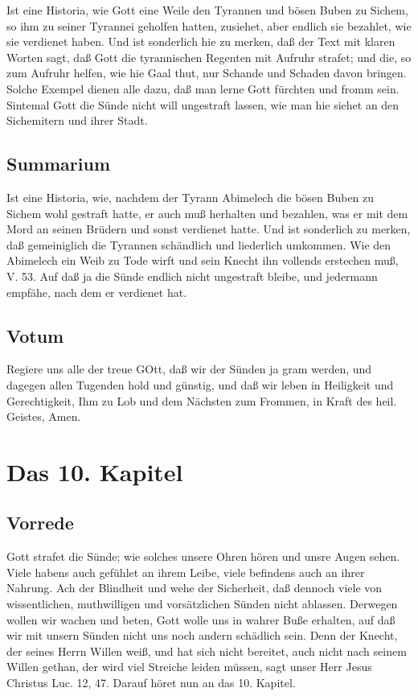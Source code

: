 Ist eine Historia, wie Gott eine Weile den Tyrannen und bösen Buben zu Sichem, so ihm zu seiner Tyrannei geholfen hatten, zusiehet, aber endlich sie bezahlet, wie sie verdienet haben. Und ist sonderlich hie zu merken, daß der Text mit klaren Worten sagt, daß Gott die tyrannischen Regenten mit Aufruhr strafet; und die, so zum Aufruhr helfen, wie hie Gaal thut, nur Schande und Schaden davon bringen. Solche Exempel dienen alle dazu, daß man lerne Gott fürchten und fromm sein. Sintemal Gott die Sünde nicht will ungestraft lassen, wie man hie siehet an den Sichemitern und ihrer Stadt.

\section{Summarium}

Ist eine Historia, wie, nachdem der Tyrann Abimelech die bösen Buben zu Sichem wohl gestraft hatte, er auch muß herhalten und bezahlen, was er mit dem Mord an seinen Brüdern und sonst verdienet hatte. Und ist sonderlich zu merken, daß gemeiniglich die Tyrannen schändlich und liederlich umkommen. Wie den Abimelech ein Weib zu Tode wirft und sein Knecht ihn vollends erstechen muß, V. 53. Auf daß ja die Sünde endlich nicht ungestraft bleibe, und jedermann empfähe, nach dem er verdienet hat.

\section{Votum}

Regiere uns alle der treue GOtt, daß wir der Sünden ja gram werden, und dagegen allen Tugenden hold und günstig, und daß wir leben in Heiligkeit und Gerechtigkeit, Ihm zu Lob und dem Nächsten zum Frommen, in Kraft des heil. Geistes, Amen.

\chapter{Das 10. Kapitel}

\section{Vorrede}

Gott strafet die Sünde; wie solches unsere Ohren hören und unsre Augen sehen. Viele habens auch gefühlet an ihrem Leibe, viele befindens auch an ihrer Nahrung. Ach der Blindheit und wehe der Sicherheit, daß dennoch viele von wissentlichen, muthwilligen und vorsätzlichen Sünden nicht ablassen. Derwegen wollen wir wachen und beten, Gott wolle uns in wahrer Buße erhalten, auf daß wir mit unsern Sünden nicht uns noch andern schädlich sein. Denn der Knecht, der seines Herrn Willen weiß, und hat sich nicht bereitet, auch nicht nach seinem Willen gethan, der wird viel Streiche leiden müssen, sagt unser Herr Jesus Christus Luc. 12, 47. Darauf höret nun an das 10. Kapitel.

